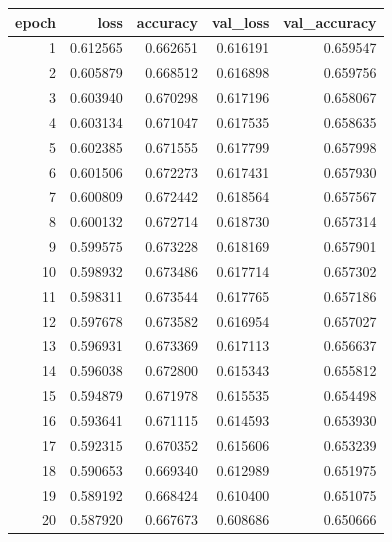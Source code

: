 \begin{tabular}{rrrrr}
\toprule
epoch & loss & accuracy & val_loss & val_accuracy \\
\midrule
1 & 0.612565 & 0.662651 & 0.616191 & 0.659547 \\
2 & 0.605879 & 0.668512 & 0.616898 & 0.659756 \\
3 & 0.603940 & 0.670298 & 0.617196 & 0.658067 \\
4 & 0.603134 & 0.671047 & 0.617535 & 0.658635 \\
5 & 0.602385 & 0.671555 & 0.617799 & 0.657998 \\
6 & 0.601506 & 0.672273 & 0.617431 & 0.657930 \\
7 & 0.600809 & 0.672442 & 0.618564 & 0.657567 \\
8 & 0.600132 & 0.672714 & 0.618730 & 0.657314 \\
9 & 0.599575 & 0.673228 & 0.618169 & 0.657901 \\
10 & 0.598932 & 0.673486 & 0.617714 & 0.657302 \\
11 & 0.598311 & 0.673544 & 0.617765 & 0.657186 \\
12 & 0.597678 & 0.673582 & 0.616954 & 0.657027 \\
13 & 0.596931 & 0.673369 & 0.617113 & 0.656637 \\
14 & 0.596038 & 0.672800 & 0.615343 & 0.655812 \\
15 & 0.594879 & 0.671978 & 0.615535 & 0.654498 \\
16 & 0.593641 & 0.671115 & 0.614593 & 0.653930 \\
17 & 0.592315 & 0.670352 & 0.615606 & 0.653239 \\
18 & 0.590653 & 0.669340 & 0.612989 & 0.651975 \\
19 & 0.589192 & 0.668424 & 0.610400 & 0.651075 \\
20 & 0.587920 & 0.667673 & 0.608686 & 0.650666 \\
\bottomrule
\end{tabular}

